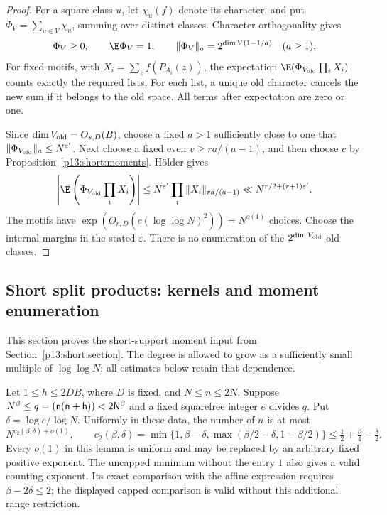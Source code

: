 \begin{proof}
For a square class \(u\), let \(\chi_u(f)\) denote its
character, and put \(\Phi_V=\sum_{u\in V}\chi_u\), summing
over distinct classes. Character orthogonality gives
\[
 \Phi_V\ge0,\qquad \E\Phi_V=1,\qquad
 \|\Phi_V\|_a=2^{\dim V(1-1/a)}\quad(a\ge1).
\]
For fixed motifs, with \(X_i=\sum_z f(P_{A_i}(z))\),
the expectation \(\E(\Phi_{V_{\rm old}}\prod_iX_i)\)
counts exactly the required lists. For each list, a unique
old character cancels the new sum if it belongs to the old
space. All terms after expectation are zero or one.

Since \(\dim V_{\rm old}=O_{s,D}(B)\), choose a fixed
\(a>1\) sufficiently close to one that
\(\|\Phi_{V_{\rm old}}\|_a\le N^{\varepsilon'}\).
Next choose a fixed even \(v\ge ra/(a-1)\), and then choose
\(c\) by Proposition~\ref{p13:short:moments}.
H\"older gives
\[
 \left|\E\left(\Phi_{V_{\rm old}}\prod_iX_i\right)\right|
 \le N^{\varepsilon'}\prod_i
       \|X_i\|_{ra/(a-1)}
 \ll N^{r/2+(r+1)\varepsilon'}.
\]
The motifs have
\(\exp(O_{r,D}(c(\log\log N)^2))=N^{o(1)}\) choices.
Choose the internal margins in the stated \(\varepsilon\).
There is no enumeration of the \(2^{\dim V_{\rm old}}\)
old classes.
\end{proof}

\subsection{Short split products: kernels and moment enumeration}
\label{p14:comp:short}

This section proves the short-support moment input from
Section~\ref{p13:short:section}.  The degree is allowed to grow as a
sufficiently small multiple of $\log\log N$; all estimates below
retain that dependence.

\begin{lemma}
\label{p13:short:quadratic}
Let \(1\le h\le2DB\), where \(D\) is fixed, and \(N\le n\le2N\).
Suppose \(N^\beta\le q=\sf(n(n+h))<2N^\beta\) and a fixed squarefree
integer \(e\) divides \(q\). Put \(\delta=\log e/\log N\).
Uniformly in these data, the number of \(n\) is at most
\[
 N^{c_2(\beta,\delta)+o(1)},\qquad
 c_2(\beta,\delta)=
 \min\{1,\beta-\delta,\max(\beta/2-\delta,1-\beta/2)\}
 \le \tfrac12+\tfrac\beta4-\tfrac\delta2.
\]
Every \(o(1)\) in this lemma is uniform and may be replaced
by an arbitrary fixed positive exponent.
The uncapped minimum without the entry \(1\) also gives a valid
counting exponent.  Its exact comparison with the affine expression
requires \(\beta-2\delta\le2\); the displayed capped comparison is
valid without this additional range restriction.
\end{lemma}

